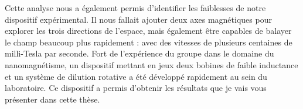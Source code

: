 Cette analyse nous a également permis d'identifier les faiblesses de notre dispositif expérimental. Il nous fallait ajouter deux axes magnétiques pour explorer les trois directions de l'espace, mais également être capables de balayer le champ beaucoup plus rapidement : avec des vitesses de plusieurs centaines de milli-Tesla par seconde. Fort de l'expérience du groupe dans le domaine du nanomagnétisme, un dispositif mettant en jeux deux bobines de faible inductance et un système de dilution rotative a été développé rapidement au sein du laboratoire. Ce dispositif a permis d'obtenir les résultats que je vais vous présenter dans cette thèse.

